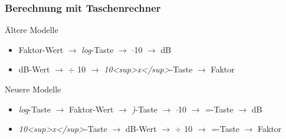 \begin{frame}
\frametitle{Berechnung mit Taschenrechner}
Ältere Modelle

\begin{itemize}
  \item Faktor-Wert $\rightarrow$ \emph{log}-Taste $\rightarrow$ $\cdot$10 $\rightarrow$ dB
  \item dB-Wert $\rightarrow$  $\div$ 10 $\rightarrow$ \emph{10<sup>x</sup>}-Taste $\rightarrow$ Faktor
  \end{itemize}
Neuere Modelle

\begin{itemize}
  \item \emph{log}-Taste $\rightarrow$ Faktor-Wert $\rightarrow$ \emph{)}-Taste $\rightarrow$ $\cdot$10 $\rightarrow$ \emph{=}-Taste $\rightarrow$ dB
  \item \emph{10<sup>x</sup>}-Taste $\rightarrow$ dB-Wert $\rightarrow$  $\div$ 10 $\rightarrow$ \emph{=}-Taste $\rightarrow$ Faktor
  \end{itemize}
\end{frame}

\begin{frame}
\end{frame}%
